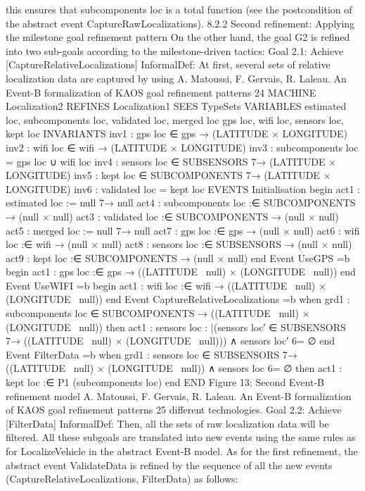 this ensures that subcomponents loc is a total function (see the postcondition of the
abstract event CaptureRawLocalizations).
8.2.2 Second refinement: Applying the milestone goal refinement pattern
On the other hand, the goal G2 is refined into two sub-goals according to the milestone-driven
tactics:
Goal 2.1: Achieve [CaptureRelativeLocalizations]
InformalDef: At first, several sets of relative localization data are captured by using
A. Matoussi, F. Gervais, R. Laleau. An Event-B formalization of KAOS goal refinement patterns 24
MACHINE Localization2
REFINES Localization1
SEES TypeSets
VARIABLES
estimated loc, subcomponents loc, validated loc, merged loc
gps loc, wifi loc, sensors loc, kept loc
INVARIANTS
inv1 : gps loc ∈ {gps} → (LATITUDE × LONGITUDE)
inv2 : wifi loc ∈ {wifi} → (LATITUDE × LONGITUDE)
inv3 : subcomponents loc = gps loc ∪ wifi loc
inv4 : sensors loc ∈ SUBSENSORS 7→ (LATITUDE × LONGITUDE)
inv5 : kept loc ∈ SUBCOMPONENTS 7→ (LATITUDE × LONGITUDE)
inv6 : validated loc = kept loc
EVENTS
Initialisation
begin
act1 : estimated loc := null 7→ null
act4 : subcomponents loc :∈ SUBCOMPONENTS → ({null} × {null})
act3 : validated loc :∈ SUBCOMPONENTS → ({null} × {null})
act5 : merged loc := null 7→ null
act7 : gps loc :∈ {gps} → ({null} × {null})
act6 : wifi loc :∈ {wifi} → ({null} × {null})
act8 : sensors loc :∈ SUBSENSORS → ({null} × {null})
act9 : kept loc :∈ SUBCOMPONENTS → ({null} × {null})
end
Event UseGPS =b
begin
act1 : gps loc :∈ {gps} → ((LATITUDE \ {null}) × (LONGITUDE \ {null}))
end
Event UseWIFI =b
begin
act1 : wifi loc :∈ {wifi} → ((LATITUDE \ {null}) × (LONGITUDE \ {null}))
end
Event CaptureRelativeLocalizations =b
when
grd1 : subcomponents loc ∈ SUBCOMPONENTS → ((LATITUDE \ {null}) × (LONGITUDE \
{null}))
then
act1 : sensors loc : |(sensors loc′ ∈ SUBSENSORS 7→ ((LATITUDE \ {null}) ×
(LONGITUDE \ {null}))) ∧ sensors loc′
6= ∅
end
Event FilterData =b
when
grd1 : sensors loc ∈ SUBSENSORS 7→ ((LATITUDE \ {null}) × (LONGITUDE \ {null})) ∧
sensors loc 6= ∅
then
act1 : kept loc :∈ P1 (subcomponents loc)
end
END
Figure 13: Second Event-B refinement model
A. Matoussi, F. Gervais, R. Laleau. An Event-B formalization of KAOS goal refinement patterns 25
different technologies.
Goal 2.2: Achieve [FilterData]
InformalDef: Then, all the sets of raw localization data will be filtered.
All these subgoals are translated into new events using the same rules as for LocalizeVehicle in the abstract Event-B model. As for the first refinement, the abstract event ValidateData is refined by the sequence of all the new events (CaptureRelativeLocalizations,
FilterData) as follows:
